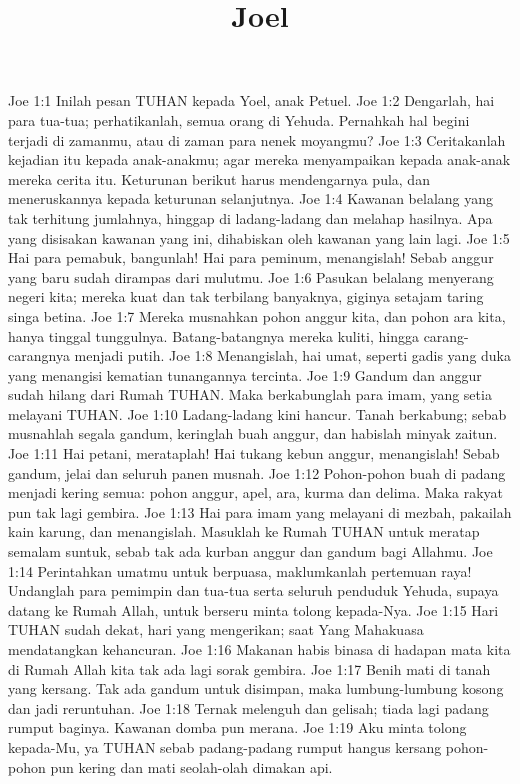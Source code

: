

\title{Joel}

Joe 1:1  Inilah pesan TUHAN kepada Yoel, anak Petuel.
Joe 1:2  Dengarlah, hai para tua-tua; perhatikanlah, semua orang di Yehuda. Pernahkah hal begini terjadi di zamanmu, atau di zaman para nenek moyangmu?
Joe 1:3  Ceritakanlah kejadian itu kepada anak-anakmu; agar mereka menyampaikan kepada anak-anak mereka cerita itu. Keturunan berikut harus mendengarnya pula, dan meneruskannya kepada keturunan selanjutnya.
Joe 1:4  Kawanan belalang yang tak terhitung jumlahnya, hinggap di ladang-ladang dan melahap hasilnya. Apa yang disisakan kawanan yang ini, dihabiskan oleh kawanan yang lain lagi.
Joe 1:5  Hai para pemabuk, bangunlah! Hai para peminum, menangislah! Sebab anggur yang baru sudah dirampas dari mulutmu.
Joe 1:6  Pasukan belalang menyerang negeri kita; mereka kuat dan tak terbilang banyaknya, giginya setajam taring singa betina.
Joe 1:7  Mereka musnahkan pohon anggur kita, dan pohon ara kita, hanya tinggal tunggulnya. Batang-batangnya mereka kuliti, hingga carang-carangnya menjadi putih.
Joe 1:8  Menangislah, hai umat, seperti gadis yang duka yang menangisi kematian tunangannya tercinta.
Joe 1:9  Gandum dan anggur sudah hilang dari Rumah TUHAN. Maka berkabunglah para imam, yang setia melayani TUHAN.
Joe 1:10  Ladang-ladang kini hancur. Tanah berkabung; sebab musnahlah segala gandum, keringlah buah anggur, dan habislah minyak zaitun.
Joe 1:11  Hai petani, merataplah! Hai tukang kebun anggur, menangislah! Sebab gandum, jelai dan seluruh panen musnah.
Joe 1:12  Pohon-pohon buah di padang menjadi kering semua: pohon anggur, apel, ara, kurma dan delima. Maka rakyat pun tak lagi gembira.
Joe 1:13  Hai para imam yang melayani di mezbah, pakailah kain karung, dan menangislah. Masuklah ke Rumah TUHAN untuk meratap semalam suntuk, sebab tak ada kurban anggur dan gandum bagi Allahmu.
Joe 1:14  Perintahkan umatmu untuk berpuasa, maklumkanlah pertemuan raya! Undanglah para pemimpin dan tua-tua serta seluruh penduduk Yehuda, supaya datang ke Rumah Allah, untuk berseru minta tolong kepada-Nya.
Joe 1:15  Hari TUHAN sudah dekat, hari yang mengerikan; saat Yang Mahakuasa mendatangkan kehancuran.
Joe 1:16  Makanan habis binasa di hadapan mata kita di Rumah Allah kita tak ada lagi sorak gembira.
Joe 1:17  Benih mati di tanah yang kersang. Tak ada gandum untuk disimpan, maka lumbung-lumbung kosong dan jadi reruntuhan.
Joe 1:18  Ternak melenguh dan gelisah; tiada lagi padang rumput baginya. Kawanan domba pun merana.
Joe 1:19  Aku minta tolong kepada-Mu, ya TUHAN sebab padang-padang rumput hangus kersang pohon-pohon pun kering dan mati seolah-olah dimakan api.

